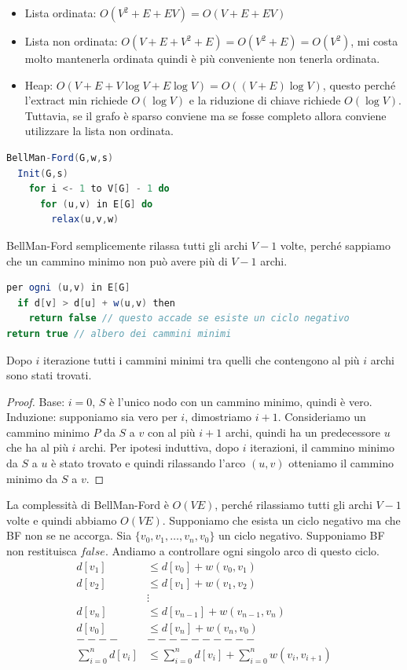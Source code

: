 \documentclass[a4paper]{article}
\begin{document}
\begin{itemize}
  \item Lista ordinata: $O(V^2 + E + EV) = O(V + E + EV)$
  \item Lista non ordinata: $O(V + E + V^2 + E) = O(V^2 + E) = O(V^2)$, mi costa molto mantenerla ordinata quindi è più conveniente non tenerla ordinata.
  \item Heap: $O(V + E + V \log V + E \log V) = O((V+E)\log V)$, questo perché l'extract min richiede $O(\log V)$ e la riduzione di chiave richiede $O(\log V)$.
  Tuttavia, se il grafo è sparso conviene ma se fosse completo allora conviene utilizzare la lista non ordinata.
\end{itemize}
\begin{lstlisting}[language=Scala]
BellMan-Ford(G,w,s)
  Init(G,s)
    for i <- 1 to V[G] - 1 do
      for (u,v) in E[G] do
        relax(u,v,w)
\end{lstlisting}
BellMan-Ford semplicemente rilassa tutti gli archi $V-1$ volte, perché sappiamo che un cammino minimo non può avere più di $V-1$ archi.
\begin{lstlisting}[language=Scala]
per ogni (u,v) in E[G]
  if d[v] > d[u] + w(u,v) then
    return false // questo accade se esiste un ciclo negativo
return true // albero dei cammini minimi
\end{lstlisting}
\begin{lemma}
  Dopo $i$ iterazione tutti i cammini minimi tra quelli che contengono al più $i$ archi sono stati trovati.
\end{lemma}
\noindent
\begin{proof}
  Base: $i = 0$, $S$ è l'unico nodo con un cammino minimo, quindi è vero.
  Induzione: supponiamo sia vero per $i$, dimostriamo $i+1$. 
  Consideriamo un cammino minimo $P$ da $S$ a $v$ con al più $i+1$ archi, quindi ha un predecessore $u$ che ha al più $i$ archi.
  Per ipotesi induttiva, dopo $i$ iterazioni, il cammino minimo da $S$ a $u$ è stato trovato e quindi rilassando l'arco $(u,v)$ otteniamo il cammino minimo da $S$ a $v$.
\end{proof}
La complessità di BellMan-Ford è $O(VE)$, perché rilassiamo tutti gli archi $V-1$ volte e quindi abbiamo $O(VE)$.
Supponiamo che esista un ciclo negativo ma che BF non se ne accorga.
Sia $\{v_0, v_1, \dots, v_n, v_0\}$ un ciclo negativo. Supponiamo BF non restituisca $false$.
Andiamo a controllare ogni singolo arco di questo ciclo.
\[
\begin{aligned}
  d[v_1] &\le d[v_0] + w(v_0, v_1)\\
  d[v_2] &\le d[v_1] + w(v_1, v_2)\\
  &\vdots\\
  d[v_n] &\le d[v_{n-1}] + w(v_{n-1}, v_n)\\
  d[v_0] &\le d[v_{n}] + w(v_{n}, v_0)\\
  ----&----------\\
  \sum_{i=0}^n d[v_i] &\le \sum_{i=0}^{n} d[v_i] + \sum_{i=0}^{n} w(v_i, v_{i+1})
\end{aligned}
\]
\end{document}
